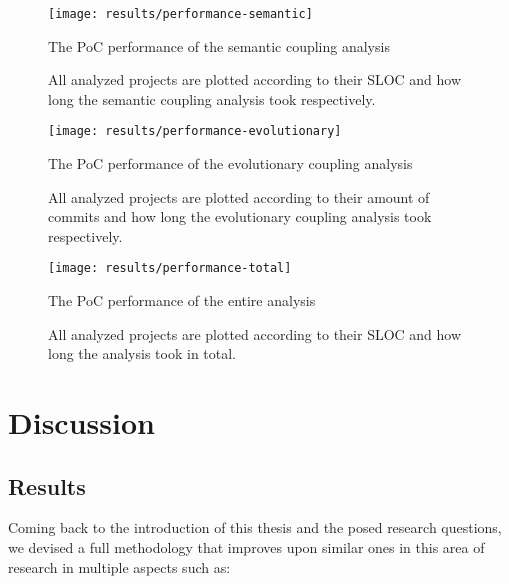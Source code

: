 \documentclass[12pt,a4paper]{report}
\begin{document}
\begin{figure}[htbp]
\centering
\texttt{[image: results/performance-semantic]}
\caption{The PoC performance of the semantic coupling analysis}
\caption*{\centering
  All analyzed projects are plotted according to their SLOC
  and how long the semantic coupling analysis took respectively.
}
\label{fig:performance-semantic}
\end{figure}

\begin{figure}[htbp]
\centering
\texttt{[image: results/performance-evolutionary]}
\caption{The PoC performance of the evolutionary coupling analysis}
\caption*{\centering
  All analyzed projects are plotted according to their amount of commits
  and how long the evolutionary coupling analysis took respectively.
}
\label{fig:performance-evolutionary}
\end{figure}

\begin{figure}[htbp]
\centering
\texttt{[image: results/performance-total]}
\caption{The PoC performance of the entire analysis}
\caption*{\centering
  All analyzed projects are plotted according to their SLOC
  and how long the analysis took in total.
}
\label{fig:performance-total}
\end{figure}




\chapter{Discussion} \label{chap:discussion}

\section{Results}

Coming back to the introduction of this thesis and the posed research
questions, we devised a full methodology that improves upon similar ones in
this area of research in multiple aspects such as:
\end{document}
